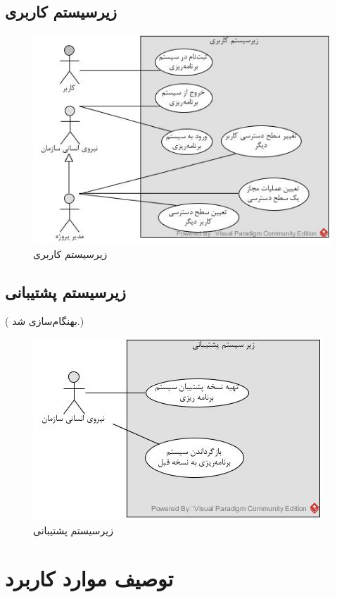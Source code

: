 \subsection{زیرسیستم کاربری}
\begin{figure}[H]
	\centering
	\includegraphics[scale=0.9]{img/usecase/user}
	\caption{زیرسیستم کاربری}
\end{figure}

\newpage
\subsection{زیرسیستم پشتیبانی}
({\color{red} بهنگام‌سازی شد.})
\begin{figure}[H]
	\centering
	\includegraphics[scale=1]{img/usecase/support}
	\caption{زیرسیستم پشتیبانی}
\end{figure}

\newpage
\section{توصیف موارد کاربرد}

